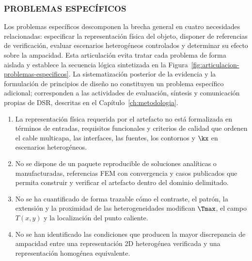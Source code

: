 \subsubsection{PROBLEMAS ESPECÍFICOS}

Los problemas específicos descomponen la brecha general en cuatro necesidades relacionadas: especificar la representación física del objeto, disponer de referencias de verificación, evaluar escenarios heterogéneos controlados y determinar su efecto sobre la ampacidad. Esta articulación evita tratar cada problema de forma aislada y establece la secuencia lógica sintetizada en la Figura~\ref{fig:articulacion-problemas-especificos}. La sistematización posterior de la evidencia y la formulación de principios de diseño no constituyen un problema específico adicional; corresponden a las actividades de evaluación, síntesis y comunicación propias de DSR, descritas en el Capítulo~\ref{ch:metodologia}.

\begin{enumerate}[label=PE\arabic*.]
  \item La representación física requerida por el artefacto no está formalizada en términos de entradas, requisitos funcionales y criterios de calidad que ordenen el cable multicapa, las interfaces, las fuentes, los contornos y $\kx$ en escenarios heterogéneos.
  \item No se dispone de un paquete reproducible de soluciones analíticas o manufacturadas, referencias FEM con convergencia y casos publicados que permita construir y verificar el artefacto dentro del dominio delimitado.
  \item No se ha cuantificado de forma trazable cómo el contraste, el patrón, la extensión y la proximidad de las heterogeneidades modifican $\Tmax$, el campo $T(x,y)$ y la localización del punto caliente.
  \item No se han identificado las condiciones que producen la mayor discrepancia de ampacidad entre una representación 2D heterogénea verificada y una representación homogénea equivalente.
\end{enumerate}

